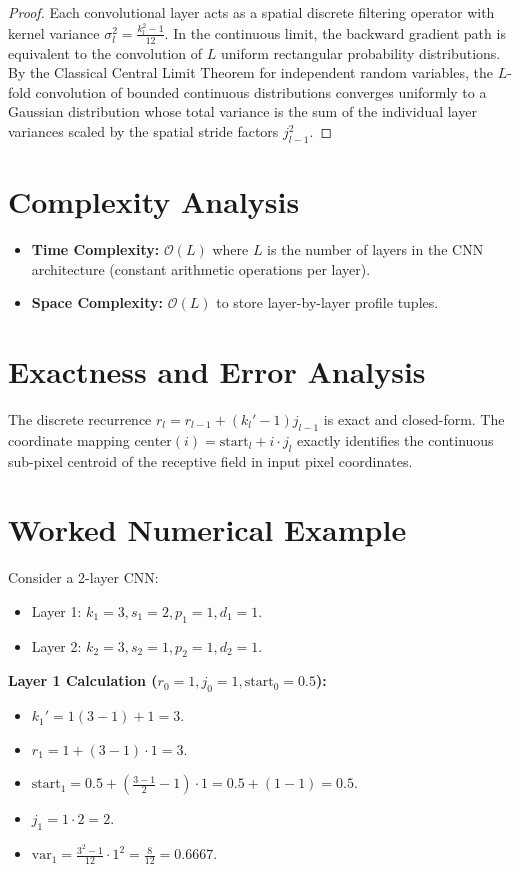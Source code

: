 \documentclass[11pt,a4paper]{article}
\theoremstyle{definition}
\begin{document}
\begin{proof}
Each convolutional layer acts as a spatial discrete filtering operator with kernel variance $\sigma_l^2 = \frac{k_l^2 - 1}{12}$. In the continuous limit, the backward gradient path is equivalent to the convolution of $L$ uniform rectangular probability distributions. By the Classical Central Limit Theorem for independent random variables, the $L$-fold convolution of bounded continuous distributions converges uniformly to a Gaussian distribution whose total variance is the sum of the individual layer variances scaled by the spatial stride factors $j_{l-1}^2$.
\end{proof}

\section{Complexity Analysis}

\begin{itemize}
    \item \textbf{Time Complexity:} $\mathcal{O}(L)$ where $L$ is the number of layers in the CNN architecture (constant arithmetic operations per layer).
    \item \textbf{Space Complexity:} $\mathcal{O}(L)$ to store layer-by-layer profile tuples.
\end{itemize}

\section{Exactness and Error Analysis}

The discrete recurrence $r_l = r_{l-1} + (k_l' - 1)j_{l-1}$ is exact and closed-form. The coordinate mapping $\text{center}(i) = \text{start}_l + i \cdot j_l$ exactly identifies the continuous sub-pixel centroid of the receptive field in input pixel coordinates.

\section{Worked Numerical Example}

Consider a 2-layer CNN:
\begin{itemize}
    \item Layer 1: $k_1 = 3, s_1 = 2, p_1 = 1, d_1 = 1$.
    \item Layer 2: $k_2 = 3, s_2 = 1, p_2 = 1, d_2 = 1$.
\end{itemize}

\textbf{Layer 1 Calculation ($r_0 = 1, j_0 = 1, \text{start}_0 = 0.5$):}
\begin{itemize}
    \item $k_1' = 1(3-1)+1 = 3$.
    \item $r_1 = 1 + (3 - 1) \cdot 1 = 3$.
    \item $\text{start}_1 = 0.5 + \left( \frac{3-1}{2} - 1 \right) \cdot 1 = 0.5 + (1 - 1) = 0.5$.
    \item $j_1 = 1 \cdot 2 = 2$.
    \item $\text{var}_1 = \frac{3^2 - 1}{12} \cdot 1^2 = \frac{8}{12} = 0.6667$.
\end{itemize}
\end{document}
